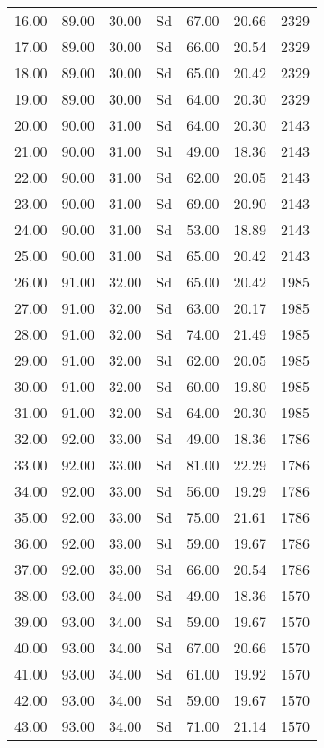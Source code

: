 \begin{center}
\begin{longtable}{|p{0.5in}|p{0.5in}|p{0.5in}|p{0.5in}|p{0.6in}|p{0.6in}|p{0.6in}|}
 16.00 & 89.00 & 30.00 & Sd & 67.00 & 20.66 & 2329 \\ 
 17.00 & 89.00 & 30.00 & Sd & 66.00 & 20.54 & 2329 \\ 
 18.00 & 89.00 & 30.00 & Sd & 65.00 & 20.42 & 2329 \\ 
 19.00 & 89.00 & 30.00 & Sd & 64.00 & 20.30 & 2329 \\ 
 20.00 & 90.00 & 31.00 & Sd & 64.00 & 20.30 & 2143 \\ 
 21.00 & 90.00 & 31.00 & Sd & 49.00 & 18.36 & 2143 \\ 
 22.00 & 90.00 & 31.00 & Sd & 62.00 & 20.05 & 2143 \\ 
 23.00 & 90.00 & 31.00 & Sd & 69.00 & 20.90 & 2143 \\ 
 24.00 & 90.00 & 31.00 & Sd & 53.00 & 18.89 & 2143 \\ 
 25.00 & 90.00 & 31.00 & Sd & 65.00 & 20.42 & 2143 \\ 
 26.00 & 91.00 & 32.00 & Sd & 65.00 & 20.42 & 1985 \\ 
 27.00 & 91.00 & 32.00 & Sd & 63.00 & 20.17 & 1985 \\ 
 28.00 & 91.00 & 32.00 & Sd & 74.00 & 21.49 & 1985 \\ 
 29.00 & 91.00 & 32.00 & Sd & 62.00 & 20.05 & 1985 \\ 
 30.00 & 91.00 & 32.00 & Sd & 60.00 & 19.80 & 1985 \\ 
 31.00 & 91.00 & 32.00 & Sd & 64.00 & 20.30 & 1985 \\ 
 32.00 & 92.00 & 33.00 & Sd & 49.00 & 18.36 & 1786 \\ 
 33.00 & 92.00 & 33.00 & Sd & 81.00 & 22.29 & 1786 \\ 
 34.00 & 92.00 & 33.00 & Sd & 56.00 & 19.29 & 1786 \\ 
 35.00 & 92.00 & 33.00 & Sd & 75.00 & 21.61 & 1786 \\ 
 36.00 & 92.00 & 33.00 & Sd & 59.00 & 19.67 & 1786 \\ 
 37.00 & 92.00 & 33.00 & Sd & 66.00 & 20.54 & 1786 \\ 
 38.00 & 93.00 & 34.00 & Sd & 49.00 & 18.36 & 1570 \\ 
 39.00 & 93.00 & 34.00 & Sd & 59.00 & 19.67 & 1570 \\ 
 40.00 & 93.00 & 34.00 & Sd & 67.00 & 20.66 & 1570 \\ 
 41.00 & 93.00 & 34.00 & Sd & 61.00 & 19.92 & 1570 \\ 
 42.00 & 93.00 & 34.00 & Sd & 59.00 & 19.67 & 1570 \\ 
 43.00 & 93.00 & 34.00 & Sd & 71.00 & 21.14 & 1570 \\ 

\end{longtable}
\end{center}
